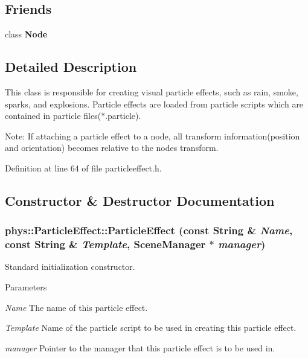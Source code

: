 \subsection*{Friends}
\begin{DoxyCompactItemize}
\item 
\hypertarget{classphys_1_1ParticleEffect_a6db9d28bd448a131448276ee03de1e6d}{
class {\bfseries Node}}
\label{d2/d69/classphys_1_1ParticleEffect_a6db9d28bd448a131448276ee03de1e6d}

\end{DoxyCompactItemize}


\subsection{Detailed Description}
This class is responsible for creating visual particle effects, such as rain, smoke, sparks, and explosions. Particle effects are loaded from particle scripts which are contained in particle files($\ast$.particle). \par
 Note: If attaching a particle effect to a node, all transform information(position and orientation) becomes relative to the nodes transform. 

Definition at line 64 of file particleeffect.h.



\subsection{Constructor \& Destructor Documentation}
\hypertarget{classphys_1_1ParticleEffect_a42d17b7cd81968603c70920c30e6f812}{
\subsubsection[{ParticleEffect}]{\setlength{\rightskip}{0pt plus 5cm}phys::ParticleEffect::ParticleEffect (const {\bf String} \& {\em Name}, \/  const {\bf String} \& {\em Template}, \/  {\bf SceneManager} $\ast$ {\em manager})}}
\label{d2/d69/classphys_1_1ParticleEffect_a42d17b7cd81968603c70920c30e6f812}


Standard initialization constructor. 


\begin{DoxyParams}{Parameters}
\item[{\em Name}]The name of this particle effect. \item[{\em Template}]Name of the particle script to be used in creating this particle effect. \item[{\em manager}]Pointer to the manager that this particle effect is to be used in. \end{DoxyParams}


